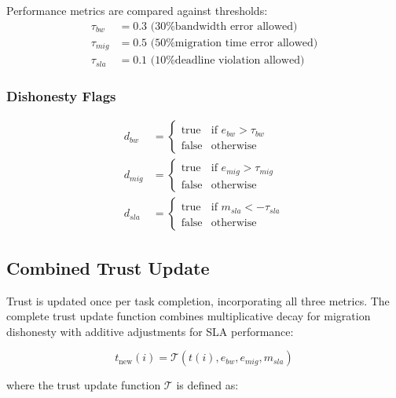 \documentclass[12pt,a4paper]{article}
\begin{document}
Performance metrics are compared against thresholds:
\begin{align}
    \tau_{bw} &= 0.3 \text{ (30\% bandwidth error allowed)} \\
    \tau_{mig} &= 0.5 \text{ (50\% migration time error allowed)} \\
    \tau_{sla} &= 0.1 \text{ (10\% deadline violation allowed)}
\end{align}

\subsubsection{Dishonesty Flags}

\begin{align}
    d_{bw} &= \begin{cases}
        \text{true} & \text{if } e_{bw} > \tau_{bw} \\
        \text{false} & \text{otherwise}
    \end{cases} \\
    d_{mig} &= \begin{cases}
        \text{true} & \text{if } e_{mig} > \tau_{mig} \\
        \text{false} & \text{otherwise}
    \end{cases} \\
    d_{sla} &= \begin{cases}
        \text{true} & \text{if } m_{sla} < -\tau_{sla} \\
        \text{false} & \text{otherwise}
    \end{cases}
\end{align}

\subsection{Combined Trust Update}

Trust is updated once per task completion, incorporating all three metrics. The complete trust update function combines multiplicative decay for migration dishonesty with additive adjustments for SLA performance:

\begin{equation}
t_{\text{new}}(i) = \mathcal{T}(t(i), e_{bw}, e_{mig}, m_{sla})
\end{equation}

where the trust update function $\mathcal{T}$ is defined as:
\end{document}
